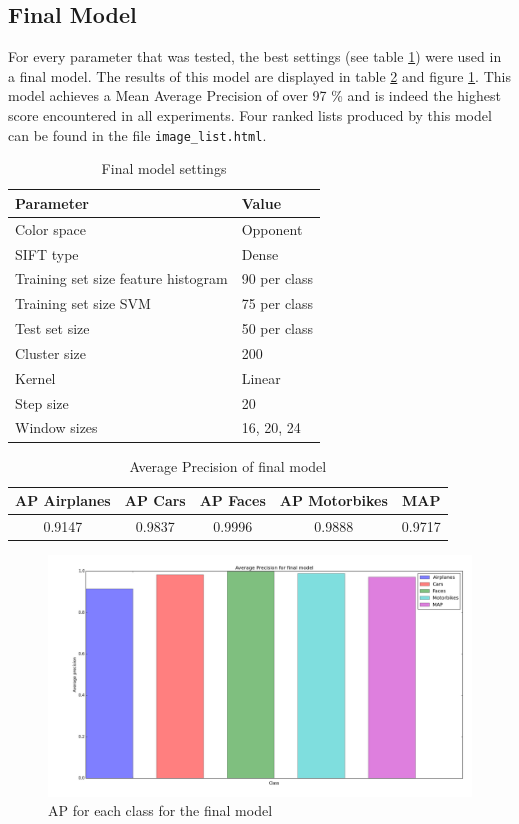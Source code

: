\subsection{Final Model}
For every parameter that was tested, the best settings (see table \ref{tab:final}) were used in a final model. The results of this model are displayed in table \ref{tab:results_final} and figure \ref{plot:final}. This model achieves a Mean Average Precision of over 97 \% and is indeed the highest score encountered in all experiments. Four ranked lists produced by this model can be found in the file \verb|image_list.html|.
 
\begin{table}[H]
\begin{center}
\begin{tabular}{|l|l|}
\hline
\textbf{Parameter} & \textbf{Value}\\
\hline
Color space & Opponent\\
SIFT type & Dense\\
Training set size feature histogram & 90 per class\\
Training set size SVM & 75 per class\\
Test set size & 50 per class \\
Cluster size & 200 \\
Kernel & Linear \\
Step size & 20\\
Window sizes & 16, 20, 24\\
\hline
\end{tabular}
\caption{Final model settings}
\label{tab:final}
\end{center}
\end{table}

\begin{table}[H]
\begin{center}
\begin{tabular}{|ccccc|}
\hline
\textbf{AP Airplanes} & \textbf{AP Cars} & \textbf{AP Faces} & \textbf{AP Motorbikes} & \textbf{MAP}\\
\hline
0.9147 & 0.9837 & 0.9996 & 0.9888 & 0.9717\\
\hline
\end{tabular}
\caption{Average Precision of final model}
\label{tab:results_final}
\end{center}
\end{table}

\begin{figure}[H]
\includegraphics[width=\textwidth]{../plots/final_model}
\caption{AP for each class for the final model}
\label{plot:final}
\end{figure}